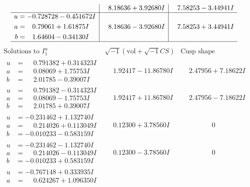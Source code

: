 \documentclass[1p]{elsarticle_modified}
\theoremstyle{definition}
\newcommand{\I}{\sqrt{-1}}
\begin{document}
$$\begin{array}{c|c|c}
 & \phantom{-}8.18636 + 3.92680 I & \phantom{-}7.58253 - 3.44941 I \\ \hline\begin{aligned}
u &= -0.728728 - 0.451672 I \\
a &= \phantom{-}0.79061 + 1.61875 I \\
b &= \phantom{-}1.64604 - 0.34130 I\end{aligned}
 & \phantom{-}8.18636 - 3.92680 I & \phantom{-}7.58253 + 3.44941 I\\
 \hline 
 \end{array}$$\newpage$$\begin{array}{c|c|c}  
\text{Solutions to }I^u_{1}& \I (\text{vol} + \sqrt{-1}CS) & \text{Cusp shape}\\
 \hline 
\begin{aligned}
u &= \phantom{-}0.791382 + 0.314323 I \\
a &= \phantom{-}0.08069 + 1.75753 I \\
b &= \phantom{-}2.01785 - 0.39007 I\end{aligned}
 & \phantom{-}1.92417 - 11.86780 I & \phantom{-}2.47956 + 7.18622 I \\ \hline\begin{aligned}
u &= \phantom{-}0.791382 - 0.314323 I \\
a &= \phantom{-}0.08069 - 1.75753 I \\
b &= \phantom{-}2.01785 + 0.39007 I\end{aligned}
 & \phantom{-}1.92417 + 11.86780 I & \phantom{-}2.47956 - 7.18622 I \\ \hline\begin{aligned}
u &= -0.231462 + 1.132740 I \\
a &= \phantom{-}0.214026 + 0.113049 I \\
b &= -0.010233 - 0.583159 I\end{aligned}
 & \phantom{-}0.12300 + 3.78560 I & \phantom{-0.000000 } 0 \\ \hline\begin{aligned}
u &= -0.231462 - 1.132740 I \\
a &= \phantom{-}0.214026 - 0.113049 I \\
b &= -0.010233 + 0.583159 I\end{aligned}
 & \phantom{-}0.12300 - 3.78560 I & \phantom{-0.000000 } 0 \\ \hline\begin{aligned}
u &= -0.767148 + 0.333935 I \\
a &= \phantom{-}0.624267 + 1.096350 I \\

\end{aligned}
\end{array}$$
\end{document}
